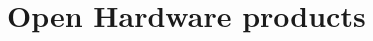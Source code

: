 \documentclass[compress,red]{beamer}
\begin{document}

\section{Open Hardware products}

\subsection*{} %
\end{document}
